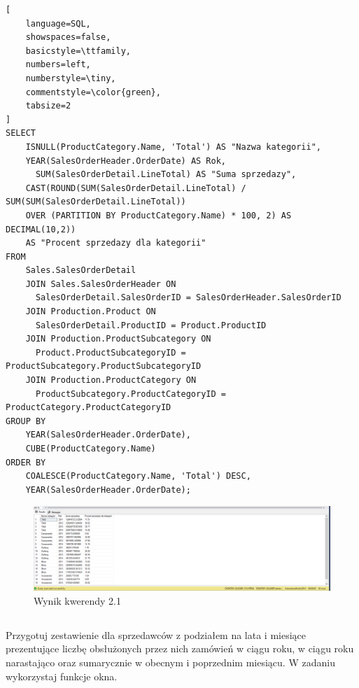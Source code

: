 \documentclass[a4paper,12pt]{article}
\begin{document}
  {\small
    \begin{lstlisting}[
	language=SQL,
	showspaces=false,
	basicstyle=\ttfamily,
	numbers=left,
	numberstyle=\tiny,
	commentstyle=\color{green},
	tabsize=2
]
SELECT 
    ISNULL(ProductCategory.Name, 'Total') AS "Nazwa kategorii",
    YEAR(SalesOrderHeader.OrderDate) AS Rok,
	  SUM(SalesOrderDetail.LineTotal) AS "Suma sprzedazy",
    CAST(ROUND(SUM(SalesOrderDetail.LineTotal) / SUM(SUM(SalesOrderDetail.LineTotal)) 
    OVER (PARTITION BY ProductCategory.Name) * 100, 2) AS DECIMAL(10,2)) 
    AS "Procent sprzedazy dla kategorii"
FROM 
    Sales.SalesOrderDetail
    JOIN Sales.SalesOrderHeader ON 
      SalesOrderDetail.SalesOrderID = SalesOrderHeader.SalesOrderID
    JOIN Production.Product ON 
      SalesOrderDetail.ProductID = Product.ProductID
    JOIN Production.ProductSubcategory ON 
      Product.ProductSubcategoryID = ProductSubcategory.ProductSubcategoryID
    JOIN Production.ProductCategory ON 
      ProductSubcategory.ProductCategoryID = ProductCategory.ProductCategoryID
GROUP BY 
    YEAR(SalesOrderHeader.OrderDate),
    CUBE(ProductCategory.Name)
ORDER BY 
    COALESCE(ProductCategory.Name, 'Total') DESC,
    YEAR(SalesOrderHeader.OrderDate);
\end{lstlisting}}

\begin{figure}[H]
  \centering
  \includegraphics[width=1.0\textwidth]{images/2.1.png}
  \caption{Wynik kwerendy 2.1}
\end{figure}

\subsection{}

Przygotuj zestawienie dla sprzedawców z podziałem na lata i miesiące prezentujące
liczbę obsłużonych przez nich zamówień w ciągu roku, w ciągu roku narastająco oraz
sumarycznie w obecnym i poprzednim miesiącu. W zadaniu wykorzystaj funkcje okna.
\end{document}
